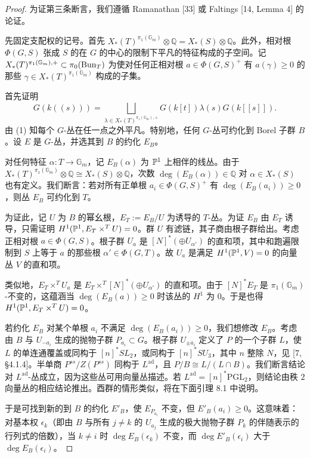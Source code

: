 \begin{proof}
为证第三条断言，我们遵循 Ramanathan [33] 或 Faltings [14, Lemma 4] 的论证。

先固定支配权的记号。首先 $X_*(T)^{\pi_1(\mathbb{G}_m)}\otimes\mathbb{Q}=X_*(S)\otimes\mathbb{Q}$。此外，相对根 $\Phi(G,S)$ 张成 $S$ 的在 $G$ 的中心的限制下平凡的特征构成的子空间。记 $X_*(T)^{\pi_1(\mathbb{G}_m),+}\subset\pi_0(\mathrm{Bun}_T)$ 为使对任何正相对根 $a\in\Phi(G,S)^+$ 有 $a(\gamma)\ge 0$ 的那些 $\gamma\in X_*(T)^{\pi_1(\mathbb{G}_m)}$ 构成的子集。

首先证明
\[
G(k((s)))=\bigsqcup_{\lambda\in X_*(T)^{\pi_1(\mathbb{G}_m),+}}G(k[t])\lambda(s)G(k[[s]]).
\]
由 (1) 知每个 $G$-丛在任一点之外平凡。特别地，任何 $G$-丛可约化到 Borel 子群 $B$。设 $E$ 是 $G$-丛，并选其到 $B$ 的约化 $E_B$。

对任何特征 $\alpha:T\to\mathbb{G}_m$，记 $E_B(\alpha)$ 为 $\mathbb{P}^1$ 上相伴的线丛。由于 $X_*(T)^{\pi_1(\mathbb{G}_m)}\otimes\mathbb{Q}\cong X_*(S)\otimes\mathbb{Q}$，次数 $\deg(E_B(\alpha))\in\mathbb{Q}$ 对 $\alpha\in X_*(S)$ 也有定义。我们断言：若对所有正单根 $a_i\in\Phi(G,S)^+$ 有 $\deg(E_B(a_i))\ge 0$，则丛 $E_B$ 可约化到 $T$。

为证此，记 $U$ 为 $B$ 的幂幺根，$E_T:=E_B/U$ 为诱导的 $T$-丛。为证 $E_B$ 由 $E_T$ 诱导，只需证明 $H^1(\mathbb{P}^1,E_T\times^TU)=0$。群 $U$ 有滤链，其子商由根子群给出。考虑正相对根 $a\in\Phi(G,S)$。根子群 $U_a$ 是 $[N]^*(\oplus U_{\alpha'})$ 的直和项，其中和跑遍限制到 $S$ 上等于 $a$ 的那些根 $\alpha'\in\Phi(G,T)$。故 $U_a$ 是满足 $H^1(\mathbb{P}^1,V)=0$ 的向量丛 $V$ 的直和项。

类似地，$E_T\times^TU_a$ 是 $E_T\times^T[N]^*(\oplus U_{\alpha'})$ 的直和项。由于 $[N]^*E_T$ 是 $\pi_1(\mathbb{G}_m)$-不变的，这蕴涵当 $\deg(E_B(a))\ge 0$ 时该丛的 $H^1$ 为 $0$。于是也得 $H^1(\mathbb{P}^1,E_T\times^TU)=0$。

若约化 $E_B$ 对某个单根 $a_i$ 不满足 $\deg(E_B(a_i))\ge 0$，我们想修改 $E_B$。考虑由 $B$ 与 $U_{-a_i}$ 生成的抛物子群 $P_{a_i}\subset G$。根子群 $U_{\pm a_i}$ 定义了 $P$ 的一个子群 $L$，使 $L$ 的单连通覆盖或同构于 $[n]^*SL_2$，或同构于 $[n]^*SU_3$，其中 $n$ 整除 $N$，见 [7, §4.1.4]。半单商 $P^{ss}/Z(P^{ss})$ 同构于 $L^{\mathrm{ad}}$，且 $P/B\cong L/(L\cap B)$。我们断言结论对 $L^{\mathrm{ad}}$-丛成立，因为这些丛可用向量丛描述。若 $L^{\mathrm{ad}}=[n]^*\mathrm{PGL}_2$，则结论由秩 $2$ 向量丛的相应结论推出。酉群的情形类似，将在下面引理 8.1 中说明。

于是可找到新的到 $B$ 的约化 $E'_B$，使 $E_{P_{a_i}}$ 不变，但 $E'_B(a_i)\ge 0$。这意味着：对基本权 $\epsilon_k$（即由 $B$ 与所有 $j\neq k$ 的 $U_{a_j}$ 生成的极大抛物子群 $P_k$ 的伴随表示的行列式的倍数），当 $k\neq i$ 时 $\deg E_B(\epsilon_k)$ 不变，而 $\deg E'_B(\epsilon_i)$ 大于 $\deg E_B(\epsilon_i)$。


\end{proof}
